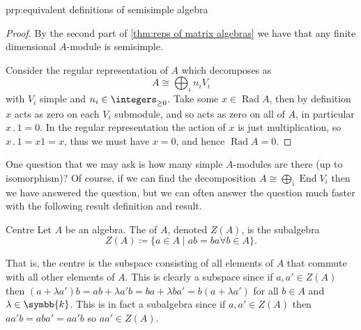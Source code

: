 \documentclass[fleqn]{NotesClass}
\renewcommand{\field}{\symbb{k}}
\DeclareMathOperator{\End}{End}
\newcommand{\action}{\mathbin{.}}
\newcommand{\isomorphic}{\cong}
\DeclareMathOperator{\Rad}{Rad}
\begin{document}
\begin{prp}{}{prp:equivalent definitions of semisimple algebra}
\begin{proof}
            By the second part of \cref{thm:reps of matrix algebras} we have that any finite dimensional \(A\)-module is semisimple.
            
            Consider the regular representation of \(A\) which decomposes as
            \begin{equation}
                A \isomorphic \bigoplus_i n_i V_i
            \end{equation}
            with \(V_i\) simple and \(n_i \in \integers_{\ge 0}\).
            Take some \(x \in \Rad A\), then by definition \(x\) acts as zero on each \(V_i\) submodule, and so acts as zero on all of \(A\), in particular \(x \action 1 = 0\).
            In the regular representation the action of \(x\) is just multiplication, so \(x \action 1 = x1 = x\), thus we must have \(x = 0\), and hence \(\Rad A = 0\).
        \end{proof}
    \end{prp}
    
    One question that we may ask is how many simple \(A\)-modules are there (up to isomorphism)?
    Of course, if we can find the decomposition \(A \isomorphic \bigoplus_i \End V_i\) then we have answered the question, but we can often answer the question much faster with the following result definition and result.
    
    \begin{dfn}{Centre}{}
        Let \(A\) be an algebra.
        The  of \(A\), denoted \(Z(A)\), is the subalgebra
        \begin{equation}
            Z(A) \coloneqq \{a \in A \mid ab = ba \forall b \in A\}.
        \end{equation}
    \end{dfn}
    
    That is, the centre is the subspace consisting of all elements of \(A\) that commute with all other elements of \(A\).
    This is clearly a subspace since if \(a, a' \in Z(A)\) then \((a + \lambda a')b = ab + \lambda a'b = ba + \lambda ba' = b(a + \lambda a')\) for all \(b \in A\) and \(\lambda \in \field\).
    This is in fact a subalgebra since if \(a, a' \in Z(A)\) then \(aa'b = aba' = aa'b\) so \(aa' \in Z(A)\).
    
\end{document}
